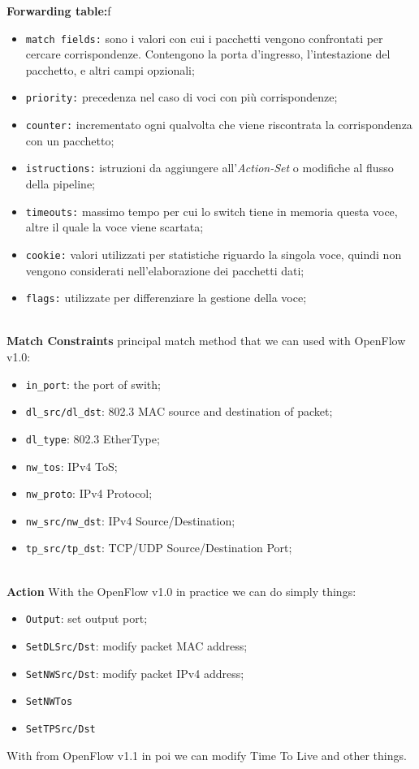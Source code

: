 \documentclass[conference,10pt]{IEEEtran}
\begin{document}
\textbf{Forwarding table:}f
\begin{itemize}
 \item \texttt{match fields:} sono i valori con cui i pacchetti vengono confrontati per cercare corrispondenze. Contengono la porta d'ingresso, l'intestazione del pacchetto, 
 e altri campi opzionali;
 \item \texttt{priority:} precedenza nel caso di voci con pi\`u corrispondenze;
 \item \texttt{counter:} incrementato ogni qualvolta che viene riscontrata la corrispondenza con un pacchetto;
 \item \texttt{istructions:} istruzioni da aggiungere all'\emph{Action-Set} o modifiche al flusso della pipeline;
 \item \texttt{timeouts:} massimo tempo per cui lo switch tiene in memoria questa voce, altre il quale la voce viene scartata;
 \item \texttt{cookie:} valori utilizzati per statistiche riguardo la singola voce, quindi non vengono considerati nell'elaborazione dei pacchetti dati;
 \item \texttt{flags:} utilizzate per differenziare la gestione della voce;
 \\
 \\
\end{itemize}

\textbf{Match Constraints}
principal match method that we can used with OpenFlow v1.0:
\begin{itemize}
 \item \texttt{in_port}: the port of swith;
 \item \texttt{dl_src/dl_dst}: 802.3 MAC source and destination of packet;
 \item \texttt{dl_type}: 802.3 EtherType;
 \item \texttt{nw_tos}: IPv4 ToS;
 \item \texttt{nw_proto}: IPv4 Protocol;
 \item \texttt{nw_src/nw_dst}: IPv4 Source/Destination;
 \item \texttt{tp_src/tp_dst}: TCP/UDP Source/Destination Port;
 \\
 \\
\end{itemize}

\textbf{Action}
With the OpenFlow v1.0 in practice we can do simply things:
\begin{itemize}
 \item \texttt{Output}: set output port;
 \item \texttt{SetDLSrc/Dst}: modify packet MAC address;
 \item \texttt{SetNWSrc/Dst}: modify packet IPv4 address;
 \item \texttt{SetNWTos}
 \item \texttt{SetTPSrc/Dst}
\end{itemize}
With from OpenFlow v1.1 in poi we can modify Time To Live and other things.
\end{document}
